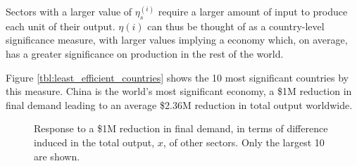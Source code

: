 \documentclass[a4paper]{article}
\begin{document}
Sectors with a larger value of $\eta_s^{(i)}$ require a larger amount of input to produce each unit of their output. $\eta{(i)}$ can thus be thought of as a country-level significance measure, with larger values implying a economy which, on average, has a greater significance on production in the rest of the world.

Figure \ref{tbl:least_efficient_countries} shows the 10 most significant countries by this measure.
China is the world's most significant economy, a \$1M reduction in final demand leading to an average \$2.36M reduction in total output worldwide.

\begin{figure}
	\centering
	\caption{Response to a \$1M reduction in final demand, in terms of difference induced in the total output, $x$, of other sectors. Only the largest 10 are shown.}
\end{figure}
\end{document}
